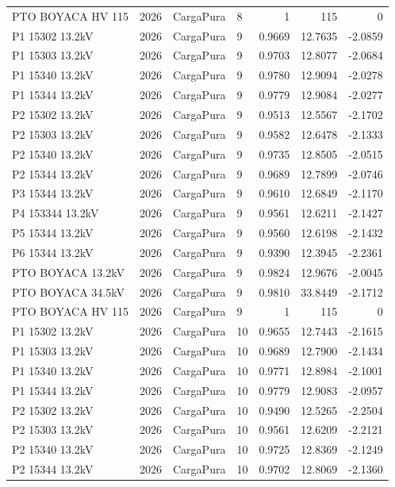 \documentclass[11pt,a4paper]{article}
\begin{document}
\begin{longtable}{llllrrr}
PTO BOYACA HV 115 & 2026 & CargaPura & 8 & 1 & 115 & 0 \\
P1 15302 13.2kV & 2026 & CargaPura & 9 & 0.9669 & 12.7635 & -2.0859 \\
P1 15303 13.2kV & 2026 & CargaPura & 9 & 0.9703 & 12.8077 & -2.0684 \\
P1 15340 13.2kV & 2026 & CargaPura & 9 & 0.9780 & 12.9094 & -2.0278 \\
P1 15344 13.2kV & 2026 & CargaPura & 9 & 0.9779 & 12.9084 & -2.0277 \\
P2 15302 13.2kV & 2026 & CargaPura & 9 & 0.9513 & 12.5567 & -2.1702 \\
P2 15303 13.2kV & 2026 & CargaPura & 9 & 0.9582 & 12.6478 & -2.1333 \\
P2 15340 13.2kV & 2026 & CargaPura & 9 & 0.9735 & 12.8505 & -2.0515 \\
P2 15344 13.2kV & 2026 & CargaPura & 9 & 0.9689 & 12.7899 & -2.0746 \\
P3 15344 13.2kV & 2026 & CargaPura & 9 & 0.9610 & 12.6849 & -2.1170 \\
P4 153344 13.2kV & 2026 & CargaPura & 9 & 0.9561 & 12.6211 & -2.1427 \\
P5 15344 13.2kV & 2026 & CargaPura & 9 & 0.9560 & 12.6198 & -2.1432 \\
P6 15344 13.2kV & 2026 & CargaPura & 9 & 0.9390 & 12.3945 & -2.2361 \\
PTO BOYACA 13.2kV & 2026 & CargaPura & 9 & 0.9824 & 12.9676 & -2.0045 \\
PTO BOYACA 34.5kV & 2026 & CargaPura & 9 & 0.9810 & 33.8449 & -2.1712 \\
PTO BOYACA HV 115 & 2026 & CargaPura & 9 & 1 & 115 & 0 \\
P1 15302 13.2kV & 2026 & CargaPura & 10 & 0.9655 & 12.7443 & -2.1615 \\
P1 15303 13.2kV & 2026 & CargaPura & 10 & 0.9689 & 12.7900 & -2.1434 \\
P1 15340 13.2kV & 2026 & CargaPura & 10 & 0.9771 & 12.8984 & -2.1001 \\
P1 15344 13.2kV & 2026 & CargaPura & 10 & 0.9779 & 12.9083 & -2.0957 \\
P2 15302 13.2kV & 2026 & CargaPura & 10 & 0.9490 & 12.5265 & -2.2504 \\
P2 15303 13.2kV & 2026 & CargaPura & 10 & 0.9561 & 12.6209 & -2.2121 \\
P2 15340 13.2kV & 2026 & CargaPura & 10 & 0.9725 & 12.8369 & -2.1249 \\
P2 15344 13.2kV & 2026 & CargaPura & 10 & 0.9702 & 12.8069 & -2.1360 \\

\end{longtable}
\end{document}
